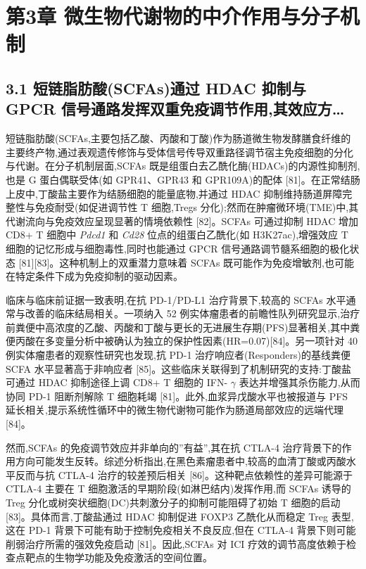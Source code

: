 \documentclass[11pt]{article}
\begin{document}
\section{第3章 微生物代谢物的中介作用与分子机制}\label{ux7b2c3ux7ae0-ux5faeux751fux7269ux4ee3ux8c22ux7269ux7684ux4e2dux4ecbux4f5cux7528ux4e0eux5206ux5b50ux673aux5236}

\subsection{3.1 短链脂肪酸(SCFAs)通过 HDAC 抑制与 GPCR 信号通路发挥双重免疫调节作用,其效应方\ldots{}}\label{ux77edux94feux8102ux80aaux9178scfasux901aux8fc7-hdac-ux6291ux5236ux4e0e-gpcr-ux4fe1ux53f7ux901aux8defux53d1ux6325ux53ccux91cdux514dux75abux8c03ux8282ux4f5cux7528ux5176ux6548ux5e94ux65b9}

短链脂肪酸(SCFAs,主要包括乙酸、丙酸和丁酸)作为肠道微生物发酵膳食纤维的主要终产物,通过表观遗传修饰与受体信号传导双重路径调节宿主免疫细胞的分化与代谢。在分子机制层面,SCFAs 既是组蛋白去乙酰化酶(HDACs)的内源性抑制剂,也是 G 蛋白偶联受体(如 GPR41、GPR43 和 GPR109A)的配体 {[}81{]}。在正常结肠上皮中,丁酸盐主要作为结肠细胞的能量底物,并通过 HDAC 抑制维持肠道屏障完整性与免疫耐受(如促进调节性 T 细胞,Tregs 分化);然而在肿瘤微环境(TME)中,其代谢流向与免疫效应呈现显著的情境依赖性 {[}82{]}。SCFAs 可通过抑制 HDAC 增加 CD8+ T 细胞中 \emph{Pdcd1} 和 \emph{Cd28} 位点的组蛋白乙酰化(如 H3K27ac),增强效应 T 细胞的记忆形成与细胞毒性,同时也能通过 GPCR 信号通路调节髓系细胞的极化状态 {[}81{]}{[}83{]}。这种机制上的双重潜力意味着 SCFAs 既可能作为免疫增敏剂,也可能在特定条件下成为免疫抑制的驱动因素。

临床与临床前证据一致表明,在抗 PD-1/PD-L1 治疗背景下,较高的 SCFAs 水平通常与改善的临床结局相关。一项纳入 52 例实体瘤患者的前瞻性队列研究显示,治疗前粪便中高浓度的乙酸、丙酸和丁酸与更长的无进展生存期(PFS)显著相关,其中粪便丙酸在多变量分析中被确认为独立的保护性因素(HR=0.07){[}84{]}。另一项针对 40 例实体瘤患者的观察性研究也发现,抗 PD-1 治疗响应者(Responders)的基线粪便 SCFA 水平显著高于非响应者 {[}85{]}。这些临床关联得到了机制研究的支持:丁酸盐可通过 HDAC 抑制途径上调 CD8+ T 细胞的 IFN- \(\gamma\) 表达并增强其杀伤能力,从而协同 PD-1 阻断剂解除 T 细胞耗竭 {[}81{]}。此外,血浆异戊酸水平也被报道与 PFS 延长相关,提示系统性循环中的微生物代谢物可能作为肠道局部效应的远端代理 {[}84{]}。

然而,SCFAs 的免疫调节效应并非单向的''有益'',其在抗 CTLA-4 治疗背景下的作用方向可能发生反转。综述分析指出,在黑色素瘤患者中,较高的血清丁酸或丙酸水平反而与抗 CTLA-4 治疗的较差预后相关 {[}86{]}。这种靶点依赖性的差异可能源于 CTLA-4 主要在 T 细胞激活的早期阶段(如淋巴结内)发挥作用,而 SCFAs 诱导的 Treg 分化或树突状细胞(DC)共刺激分子的抑制可能阻碍了初始 T 细胞的启动 {[}83{]}。具体而言,丁酸盐通过 HDAC 抑制促进 FOXP3 乙酰化从而稳定 Treg 表型,这在 PD-1 背景下可能有助于控制免疫相关不良反应,但在 CTLA-4 背景下则可能削弱治疗所需的强效免疫启动 {[}81{]}。因此,SCFAs 对 ICI 疗效的调节高度依赖于检查点靶点的生物学功能及免疫激活的空间位置。
\end{document}
